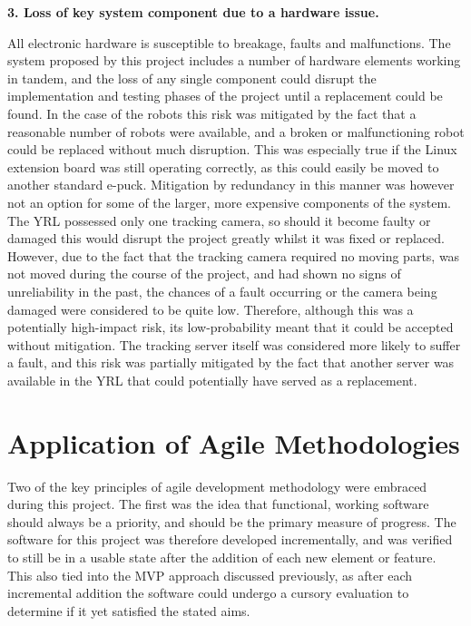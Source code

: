 \textbf{3. Loss of key system component due to a hardware issue.}

All electronic hardware is susceptible to breakage, faults and malfunctions. The system proposed by this project includes a number of hardware elements working in tandem, and the loss of any single component could disrupt the implementation and testing phases of the project until a replacement could be found. In the case of the robots this risk was mitigated by the fact that a reasonable number of robots were available, and a broken or malfunctioning robot could be replaced without much disruption. This was especially true if the Linux extension board was still operating correctly, as this could easily be moved to another standard e-puck. Mitigation by redundancy in this manner was however not an option for some of the larger, more expensive components of the system. The YRL possessed only one tracking camera, so should it become faulty or damaged this would disrupt the project greatly whilst it was fixed or replaced. However, due to the fact that the tracking camera required no moving parts, was not moved during the course of the project, and had shown no signs of unreliability in the past, the chances of a fault occurring or the camera being damaged were considered to be quite low. Therefore, although this was a potentially high-impact risk, its low-probability meant that it could be accepted without mitigation. The tracking server itself was considered more likely to suffer a fault, and this risk was partially mitigated by the fact that another server was available in the YRL that could potentially have served as a replacement.


\section{Application of Agile Methodologies} \label{Agile}

Two of the key principles of agile development methodology were embraced during this project. The first was the idea that functional, working software should always be a priority, and should be the primary measure of progress. The software for this project was therefore developed incrementally, and was verified to still be in a usable state after the addition of each new element or feature. This also tied into the MVP approach discussed previously, as after each incremental addition the software could undergo a cursory evaluation to determine if it yet satisfied the stated aims. 

